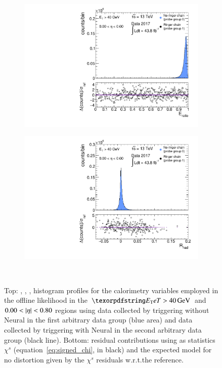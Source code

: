 \begin{figure}[b]
\begin{center}
\begin{subfigure}[c]{.48\textwidth}
\end{subfigure} \\
\begin{subfigure}[c]{.48\textwidth}
\centering
\includegraphics[width=\textwidth]{sections/analyses/figures/noAdjustment/el_eratio_et40eta0_00_sigma_base_new.pdf}
\caption{}%

\end{subfigure}
\hfill
\begin{subfigure}[c]{.48\textwidth}
\centering
\includegraphics[width=\textwidth]{sections/analyses/figures/noAdjustment/el_rhad_et40eta0_00_sigma_base_new.pdf}
\caption{}%

\end{subfigure} \\
\caption{%
	Top: \reta, \eratio, \rphi, \rhad histogram profiles for the calorimetry variables employed in the offline likelihood in the $\et>\SI{40}{\GeV}$ and $0.00<\abseta{}<0.80$ regions using data collected by
	triggering without Neural\rnn{} in the first arbitrary data group
	(blue area) and data collected by triggering with Neural\rnn{} in the second
	arbitrary data group (black line).  Bottom: residual contributions using as
	statistics $\chi^s$ (equation~\ref{eq:signed_chi}, in black) and the expected
	model for no distortion given by the $\chi^s$ residuals w.r.t.\@ the
	reference.
}%
\label{fig:groups_homogeneity_calo}
\end{center}
\end{figure}%

